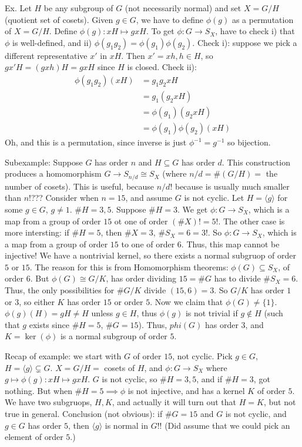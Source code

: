 \documentclass{article}
\theoremstyle{plain}
\theoremstyle{remark}
\begin{document}
Ex. Let $H$ be any subgroup of $G$
(not necessarily normal)
and set $X = G/H$ (quotient set of cosets).
Given $g \in G$, we have to define $\phi(g)$ as a permutation of $X = G/H$.
Define $\phi(g) \colon xH \mapsto gxH$.
To get $\phi \colon G \to S_X$,
have to check i) that $\phi$ is well-defined, and ii) $\phi(g_1g_2) = \phi(g_1)\phi(g_2)$.
Check i): suppose we pick a different representative $x'$ in $xH$.
Then $x' = xh, h \in H$, so $gx'H = (gxh)H = gxH$ since $H$ is closed.
Check ii):
\begin{align*}
	\phi(g_1g_2)(xH)
	&= g_1g_2xH\\
	&= g_1(g_2xH)\\
	&= \phi(g_1)(g_2xH)\\
	&= \phi(g_1)\phi(g_2)(xH)
\end{align*}
Oh, and this is a permutation, since inverse is just $\phi^{-1} = g^{-1}$
so bijection.

Subexample:
Suppose $G$ has order $n$ and $H \subseteq G$ has order $d$.
This construction produces a homomorphism $G \to S_{n/d} \cong S_X$
(where $n/d = \#(G/H) = $ the number of cosets).
This is useful, because $n/d !$ because is usually much smaller than $n!$???
Consider when $n = 15$, and assume $G$ is not cyclic.
Let $H = \langle g \rangle$ for some $g \in G$, $g \neq 1$.
$\# H = 3,5$.
Suppose $\# H = 3$.
We get $\phi \colon G \to S_X$,
which is a map from a group of order $15$ ot one of order $(\#X)! = 5!$.
The other case is more intersting:
if $\#H = 5$, then $\#X = 3$, $\# S_X = 6 = 3!$.
So $\phi\colon G \to S_X$,
which is a map from a group of order $15$ to one of order $6$.
Thus, this map cannot be injective!
We have a nontrivial kernel,
so there exists a normal subgruop of order $5$ or $15$.
The reason for this is from Homomorphism theorems:
$\phi(G) \subseteq S_X$, of order $6$.
But $\phi(G) \cong G/K$, has order dividing $15 =\#G$
has to divide $\#S_X = 6$.
Thus, the only possibilities for $\#G/K$ divide $(15,6) = 3$.
So $G/K$ has order $1$ or $3$,
so either $K$ has order $15$ or order $5$.
Now we claim that $\phi(G) \neq \{1\}$.
$\phi(g)(H) = gH \neq H$ unless $g \in H$,
thus $\phi(g)$ is not trivial if $g \not\in H$
(such that $g$ exists since $\#H = 5$, $\#G = 15$).
Thus, $phi(G)$ has order $3$,
and $K = \ker(\phi)$ is a normal subgroup of order $5$.

Recap of example:
we start with $G$ of order $15$, not cyclic.
Pick $g\in G$, $H = \langle g \rangle \subsetneq G$.
$X = G/H = $ cosets of $H$,
and $\phi \colon G \to S_X$ where $g \mapsto \phi(g) \colon xH \mapsto gxH$.
$G$ is not cyclic, so $\#H = 3,5$,
and if $\#H = 3$, got nothing.
But when $\#H = 5 \implies \phi$ is not injective,
and has a kernel $K$ of order $5$.
We have two subgruops, $H,K$, and actually it will turn out that $H = K$,
but not true in general.
Conclusion (not obvious): if $\#G = 15$ and $G$ is not cyclic,
and $g \in G$ has order $5$, then $\langle g \rangle$ is normal in $G$!!
(Did assume that we could pick an element of order $5$.)
\end{document}
